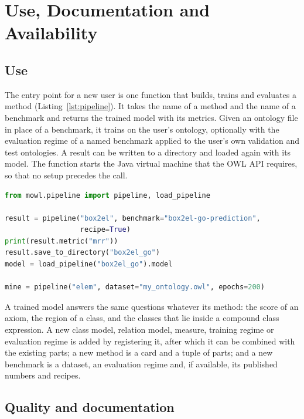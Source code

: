 \documentclass[runningheads]{llncs}
\begin{document}
\section{Use, Documentation and Availability}

\subsection{Use}

The entry point for a new user is one function that builds, trains and evaluates a
method (Listing~\ref{lst:pipeline}). It takes the name of a method and the name of a
benchmark and returns the trained model with its metrics. Given an ontology file in place
of a benchmark, it trains on the user's ontology, optionally with the evaluation regime
of a named benchmark applied to the user's own validation and test ontologies. A result
can be written to a directory and loaded again with its model. The function starts the
Java virtual machine that the OWL API requires, so that no setup precedes the call.

\begin{lstlisting}[language=Python,caption={Training and evaluating a method on a
benchmark and on a user's ontology.},label=lst:pipeline,float=t]
from mowl.pipeline import pipeline, load_pipeline

result = pipeline("box2el", benchmark="box2el-go-prediction",
                  recipe=True)
print(result.metric("mrr"))
result.save_to_directory("box2el_go")
model = load_pipeline("box2el_go").model

mine = pipeline("elem", dataset="my_ontology.owl", epochs=200)
\end{lstlisting}

A trained model answers the same questions whatever its method: the score of an axiom,
the region of a class, and the classes that lie inside a compound class expression. A new
class model, relation model, measure, training regime or evaluation regime is added by
registering it, after which it can be combined with the existing parts; a new method is
a card and a tuple of parts; and a new benchmark is a dataset, an evaluation regime and,
if available, its published numbers and recipes.

\subsection{Quality and documentation}
\end{document}
